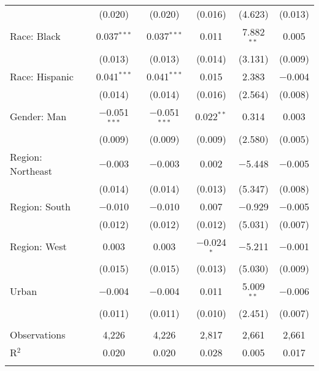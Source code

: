 \begin{tabular}{@{\extracolsep{5pt}}lccccc}
  & (0.020) & (0.020) & (0.016) & (4.623) & (0.013) \\ 
  Race: Black & 0.037$^{***}$ & 0.037$^{***}$ & 0.011 & 7.882$^{**}$ & 0.005 \\ 
  & (0.013) & (0.013) & (0.014) & (3.131) & (0.009) \\ 
  Race: Hispanic & 0.041$^{***}$ & 0.041$^{***}$ & 0.015 & 2.383 & $-$0.004 \\ 
  & (0.014) & (0.014) & (0.016) & (2.564) & (0.008) \\ 
  Gender: Man & $-$0.051$^{***}$ & $-$0.051$^{***}$ & 0.022$^{**}$ & 0.314 & 0.003 \\ 
  & (0.009) & (0.009) & (0.009) & (2.580) & (0.005) \\ 
  Region: Northeast & $-$0.003 & $-$0.003 & 0.002 & $-$5.448 & $-$0.005 \\ 
  & (0.014) & (0.014) & (0.013) & (5.347) & (0.008) \\ 
  Region: South & $-$0.010 & $-$0.010 & 0.007 & $-$0.929 & $-$0.005 \\ 
  & (0.012) & (0.012) & (0.012) & (5.031) & (0.007) \\ 
  Region: West & 0.003 & 0.003 & $-$0.024$^{*}$ & $-$5.211 & $-$0.001 \\ 
  & (0.015) & (0.015) & (0.013) & (5.030) & (0.009) \\ 
  Urban & $-$0.004 & $-$0.004 & 0.011 & 5.009$^{**}$ & $-$0.006 \\ 
  & (0.011) & (0.011) & (0.010) & (2.451) & (0.007) \\ 
 \hline \\[-1.8ex] 

Observations & 4,226 & 4,226 & 2,817 & 2,661 & 2,661 \\ 
R$^{2}$ & 0.020 & 0.020 & 0.028 & 0.005 & 0.017 \\ 
\hline 
\hline \\[-1.8ex] 
\end{tabular} 